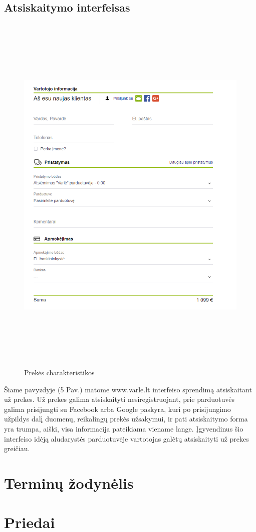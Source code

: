 \documentclass[oneside]{VUMIFPSkursinis}
\begin{document}
	\pagebreak
	\subsection{Atsiskaitymo interfeisas}
		\begin{figure}[h]
			\centering
			\includegraphics[width=12cm,height=18cm,keepaspectratio]{IkvepiantisInterfeisas5.png}
			\caption{ Prekės charakteristikos}
		\end{figure}

			Šiame pavyzdyje (5 Pav.) matome www.varle.lt interfeiso sprendimą atsiskaitant už prekes. 
			Už prekes galima atsiskaityti nesiregistruojant, prie parduotuvės galima prisijungti su Facebook arba Google paskyra, kuri po prisijungimo užpildys dalį duomenų, reikalingų prekės užsakymui, ir pati atsiskaitymo forma yra trumpa, aiški, visa informacija pateikiama viename lange. 
			Įgyvendinus šio interfeiso idėją aludarystės parduotuvėje vartotojas galėtų atsiskaityti už prekes greičiau.


\section{Terminų žodynėlis}
\section{Priedai}
\end{document}
